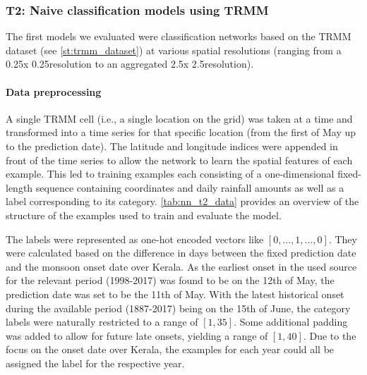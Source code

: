 \subsubsection{T2: Naive classification models using TRMM}
\label{sst:nn_t2}
The first models we evaluated were classification networks based on the TRMM dataset (see \cref{st:trmm_dataset}) at various spatial resolutions (ranging from a 0.25\degree x 0.25\degree resolution to an aggregated 2.5\degree x 2.5\degree resolution).

\paragraph{Data preprocessing}
\label{ssst:nn_t2_data}
A single TRMM cell (i.e., a single location on the grid) was taken at a time and transformed into a time series for that specific location (from the first of May up to the prediction date). The latitude and longitude indices were appended in front of the time series to allow the network to learn the spatial features of each example. This led to training examples each consisting of a one-dimensional fixed-length sequence containing coordinates and daily rainfall amounts as well as a label corresponding to its category. \cref{tab:nn_t2_data} provides an overview of the structure of the examples used to train and evaluate the model.

The labels were represented as one-hot encoded vectors like $\left[ 0, ..., 1, ..., 0 \right]$. They were calculated based on the difference in days between the fixed prediction date and the monsoon onset date over Kerala. As the earliest onset in the used source \citep{Ordonez.2016} for the relevant period (1998-2017) was found to be on the 12th of May, the prediction date was set to be the 11th of May. With the latest historical onset during the available period (1887-2017) being on the 15th of June, the category labels were naturally restricted to a range of $\left[ 1, 35 \right]$. Some additional padding was added to allow for future late onsets, yielding a range of $\left[ 1, 40 \right]$. Due to the focus on the onset date over Kerala, the examples for each year could all be assigned the label for the respective year.

